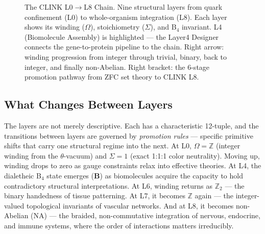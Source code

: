 \documentclass[11pt,a4paper,twocolumn]{article}
\begin{document}
\begin{figure}[t]
\caption{The CLINK L0$\to$L8 Chain. Nine structural layers from quark confinement (L0) to whole-organism integration (L8). Each layer shows its winding ($\Omega$), stoichiometry ($\Sigma$), and B$_4$ invariant. L4 (Biomolecule Assembly) is highlighted — the Layer4 Designer connects the gene-to-protein pipeline to the chain. Right arrow: winding progression from integer through trivial, binary, back to integer, and finally non-Abelian. Right bracket: the 6-stage promotion pathway from ZFC set theory to CLINK L8.}
\label{fig:clink}
\end{figure}

\subsection{What Changes Between Layers}

The layers are not merely descriptive. Each has a characteristic 12-tuple, and the transitions between layers are governed by \emph{promotion rules} — specific primitive shifts that carry one structural regime into the next. At L0, $\Omega = \mathbb{Z}$ (integer winding from the $\theta$-vacuum) and $\Sigma = 1$ (exact 1:1:1 color neutrality). Moving up, winding drops to zero as gauge constraints relax into effective theories. At L4, the dialetheic B$_4$ state emerges ($\mathbf{B}$) as biomolecules acquire the capacity to hold contradictory structural interpretations. At L6, winding returns as $\mathbb{Z}_2$ — the binary handedness of tissue patterning. At L7, it becomes $\mathbb{Z}$ again — the integer-valued topological invariants of vascular networks. And at L8, it becomes non-Abelian (NA) — the braided, non-commutative integration of nervous, endocrine, and immune systems, where the order of interactions matters irreducibly.
\end{document}
